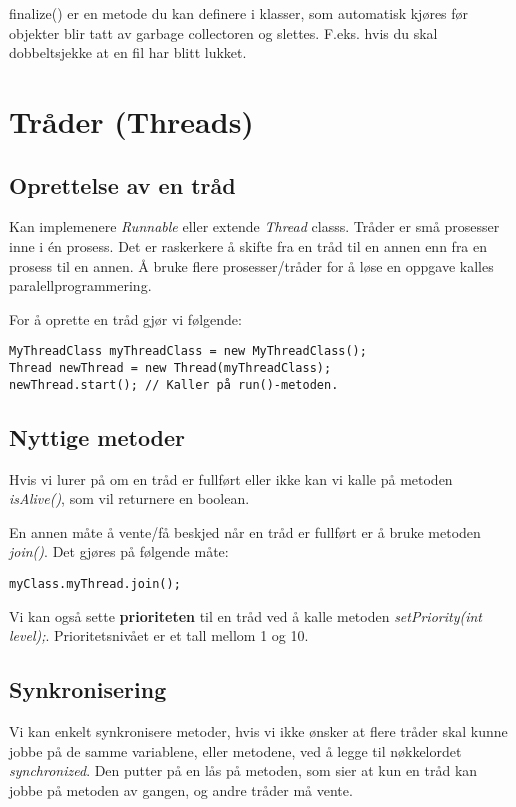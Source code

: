 \documentclass[11pt]{article}
\begin{document}
finalize() er en metode du kan definere i klasser, som automatisk
kjøres før objekter blir tatt av garbage collectoren og
slettes. F.eks. hvis du skal dobbeltsjekke at en fil har blitt lukket.
\section{Tråder (Threads)}
\label{sec-18}
\subsection{Oprettelse av en tråd}
\label{sec-18_1}

Kan implemenere \emph{Runnable} eller extende \emph{Thread} classs.
Tråder er små prosesser inne i én prosess. Det er raskerkere å 
skifte fra en tråd til en annen enn fra en prosess til en annen.
Å bruke flere prosesser/tråder for å løse en oppgave kalles
paralellprogrammering.

For å oprette en tråd gjør vi følgende:

\begin{verbatim}
MyThreadClass myThreadClass = new MyThreadClass();
Thread newThread = new Thread(myThreadClass);
newThread.start(); // Kaller på run()-metoden.
\end{verbatim}
\subsection{Nyttige metoder}
\label{sec-18_2}


Hvis vi lurer på om en tråd er fullført eller ikke kan vi kalle på
metoden \emph{isAlive()}, som vil returnere en boolean.

En annen måte å vente/få beskjed når en tråd er fullført er å bruke
metoden \emph{join()}. Det gjøres på følgende måte:

\begin{verbatim}
myClass.myThread.join();
\end{verbatim}

Vi kan også sette \textbf{prioriteten} til en tråd ved å kalle metoden
\emph{setPriority(int level);}. Prioritetsnivået er et tall mellom 1
og 10. 
\subsection{Synkronisering}
\label{sec-18_3}


Vi kan enkelt synkronisere metoder, hvis vi ikke ønsker at flere
tråder skal kunne jobbe på de samme variablene, eller metodene, ved å
legge til nøkkelordet \emph{synchronized}. Den putter på en lås på metoden,
som sier at kun en tråd kan jobbe på metoden av gangen, og andre
tråder må vente.
\end{document}

